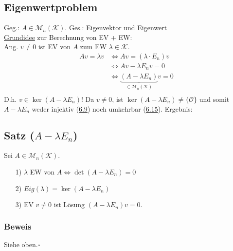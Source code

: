 \documentclass[a4paper, 12pt,titlepage, pdf, headsepline]{scrartcl}
\newcommand{\K}{\mathcal{K}}
\newcommand{\M}{\mathcal{M}}
\newcommand{\qed}{\hfill$\square$}
\renewcommand{\>}{\rightarrow}
\renewcommand{\*}{\cdot}
\renewcommand{\O}{\mathcal{O}}
\begin{document}
\subsection*{Eigenwertproblem}
Geg.: $A \in \M_n(\K)$. Ges.: Eigenvektor und Eigenwert \\
\underline{Grundidee} zur Berechnung von EV + EW:\\
Ang. $v \neq 0$ ist EV von $A$ zum EW $\lambda \in \K$.
\begin{align*}
Av = \lambda v &\Leftrightarrow Av=(\lambda \cdot E_n) v\\
&\Leftrightarrow Av - \lambda E_n v = 0 \\
&\Leftrightarrow \underbrace{(A - \lambda E_n)}_{\in \M_n(\K)} v = 0 \\
\end{align*}
D.h. $v \in \ker(A - \lambda E_n)!$ Da $v \neq 0$, ist $\ker(A - \lambda E_n) \neq \{\O\}$ und somit $A - \lambda E_n$ weder injektiv (\hyperref[6.9]{6.9}) noch umkehrbar (\hyperref[6.15]{6.15}). Ergebnis: 
\subsection{Satz ($A-\lambda E_n$)}
\label{9.4}
Sei $A \in \M_n(\K)$.
\begin{itemize}
	\item[1)] $\lambda$ EW von $A \Leftrightarrow \det(A- \lambda E_n) = 0$
	\item[2)] $Eig(\lambda) = \ker(A -\lambda E_n)$
	\item[3)] EV $v \neq 0$ ist Lösung $(A -\lambda E_n)v = 0$.
\end{itemize}
\subsubsection*{Beweis}
Siehe oben.\qed
\end{document}
